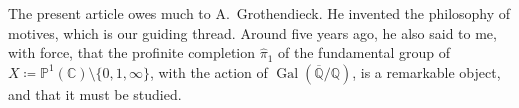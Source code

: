 \documentclass{article}
\newcommand{\bb}{\mathbb}
\DeclareMathOperator{\Gal}{Gal}
\begin{document}
\section*{}

The present article owes much to A.~Grothendieck.
He invented the philosophy of motives, which is our guiding thread.
Around five years ago, he also said to me, with force, that the profinite completion $\hat{\pi}_1$ of the fundamental group of $X\coloneqq\bb{P}^1(\bb{C})\setminus\{0,1,\infty\}$, with the action of $\Gal(\overline{\bb{Q}}/\bb{Q})$, is a remarkable object, and that it must be studied.



\nocite{*}
\end{document}
